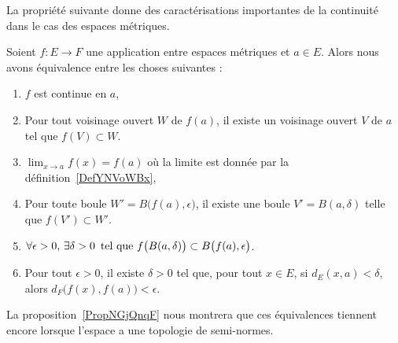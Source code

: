 La propriété suivante donne des caractérisations importantes de la continuité dans le cas des espaces métriques.
\begin{proposition} \label{PropQZRNpMn}
    Soient \( f\colon E\to F\) une application entre espaces métriques et \( a\in E\). Alors nous avons équivalence entre les choses suivantes :
    \begin{enumerate}
        \item\label{ItemCBUoRWJi}
            \( f\) est continue en \( a\),
        \item\label{ItemCBUoRWJii}
            Pour tout voisinage ouvert \( W\) de \( f(a)\), il existe un voisinage ouvert \( V\) de \( a\) tel que \( f(V)\subset W\).
        \item\label{ItemYNQpikrii}
            \( \lim_{x\to a}f(x)=f(a)\) où la limite est donnée par la définition~\ref{DefYNVoWBx},
        \item\label{ItemCBUoRWJiii}
            Pour toute boule \( W'=B\big( f(a),\epsilon \big)\), il existe une boule \( V'=B(a,\delta)\) telle que \( f(V')\subset W'\).
        \item\label{ItemCBUoRWJiv}
            $\forall \epsilon>0,\,\exists \delta>0\,\text{ tel que } f\big( B(a,\delta) \big)\subset B\big( f(a),\epsilon \big)$.
        \item\label{ItemYNQpikriii}
            Pour tout \( \epsilon>0\), il existe \( \delta>0\) tel que, pour tout \( x \in E\), si \( d_E(x,a)<\delta\), alors \( d_F\bigl(f(x),f(a)\bigr)<\epsilon\).
    \end{enumerate}
\end{proposition}
La proposition~\ref{PropNGjQnqF} nous montrera que ces équivalences tiennent encore lorsque l'espace a une topologie de semi-normes.

